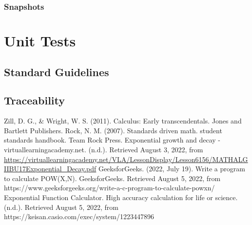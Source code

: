 \documentclass[a4paper,12pt]{report}
\begin{document}
\subsubsection{Snapshots}


\section{Unit Tests}
\subsection{Standard Guidelines}
\subsection{Traceability}






\begin{thebibliography}{9}
 Zill, D. G., \& Wright, W. S. (2011). Calculus: Early transcendentals. Jones and Bartlett Publishers.
 Rock, N. M. (2007). Standards driven math. student standards handbook. Team Rock Press.
Exponential growth and decay - virtuallearningacademy.net. (n.d.). Retrieved August 3, 2022, from  \url{https://virtuallearningacademy.net/VLA/LessonDisplay/Lesson6156/MATHALGIIBU17Exponential_Decay.pdf}
GeeksforGeeks. (2022, July 19). Write a program to calculate POW(X,N). GeeksforGeeks. Retrieved August 5, 2022, from https://www.geeksforgeeks.org/write-a-c-program-to-calculate-powxn/
Exponential Function Calculator. High accuracy calculation for life or science. (n.d.). Retrieved August 5, 2022, from https://keisan.casio.com/exec/system/1223447896
\end{thebibliography}
\end{document}
